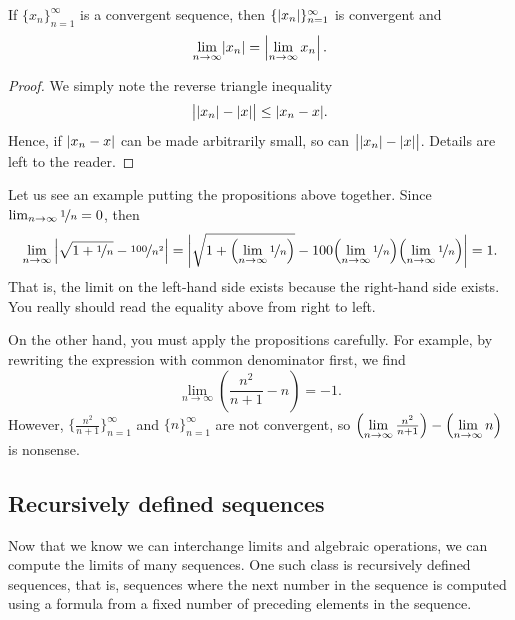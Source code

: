 \begin{prop}
If $\{ x_n \}_{n=1}^\infty$ is a convergent sequence, then $\{ \lvert {x_n} \rvert \}_{n=1}^\infty$
is convergent and
\begin{equation*}
\lim_{n\to\infty} \lvert {x_n} \rvert = 
\left\lvert {\lim_{n\to\infty} x_n} \right\rvert .
\end{equation*}
\end{prop}

\begin{proof}
We simply note the reverse triangle inequality
\begin{equation*}
\big\lvert \lvert {x_n} \rvert - \lvert {x} \rvert \big\rvert \leq \lvert {x_n-x} \rvert .
\end{equation*}
Hence, if $\lvert {x_n -x} \rvert$ can be made arbitrarily small, so can
$\big\lvert \lvert {x_n} \rvert - \lvert {x} \rvert \big\rvert$.
Details are left to the reader.
\end{proof}

Let us see an example putting the propositions above together.  Since
$\lim_{n\to\infty} \nicefrac{1}{n} = 0$, then
\begin{equation*}
\lim_{n\to \infty}
\left\lvert {\sqrt{1 + \nicefrac{1}{n}} - \nicefrac{100}{n^2}} \right\rvert =  
\left\lvert {\sqrt{1 + \Bigl(\lim_{n\to\infty} \nicefrac{1}{n}\Bigr)}
- 100 \Bigl(\lim_{n\to\infty} \nicefrac{1}{n}\Bigr)\Bigl(\lim_{n\to\infty} \nicefrac{1}{n}\Bigr)} \right\rvert = 1.
\end{equation*}
That is, the limit on the left-hand side exists because the right-hand
side exists.  You really should read the equality above from right to left.

On the other hand, you must apply the propositions carefully.
For example, by rewriting the expression with common denominator first,
we find
\begin{equation*}
\lim_{n\to \infty} \left( \frac{n^2}{n+1} - n \right)
= -1 .
\end{equation*}
However, 
$\bigl\{ \frac{n^2}{n+1} \bigr\}_{n=1}^\infty$ and 
$\{n\}_{n=1}^\infty$ are not convergent,
so
$\Bigl(\lim\limits_{n\to\infty} \frac{n^2}{n+1}\Bigr) -
\Bigl(\lim\limits_{n\to\infty} n\Bigr)$ is nonsense.

\subsection{Recursively defined sequences}

Now that we know we can interchange limits and algebraic operations, we can
compute the limits of many sequences.
One such class is recursively defined sequences, that is, sequences where
the next number in the sequence is computed using a formula from a fixed number
of preceding elements in the sequence.

